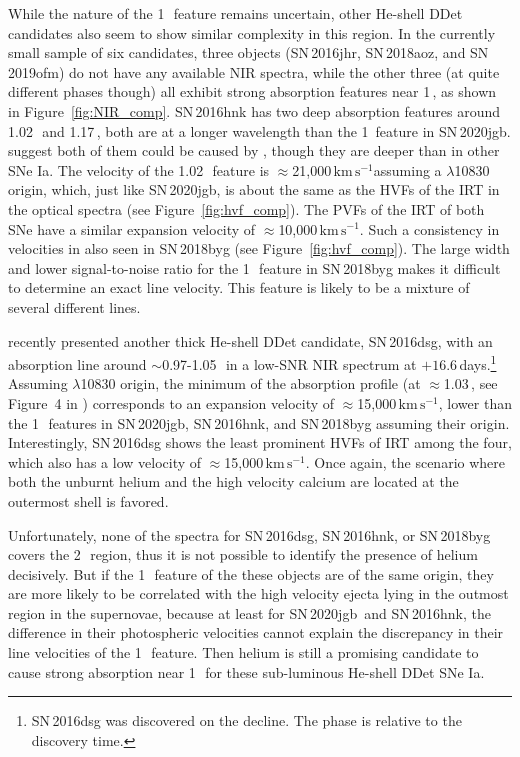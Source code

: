 \documentclass[twocolumn]{aastex631}
\newcommand{\sn}{SN\,2020jgb}
\newcommand{\kms}{$\mathrm{km}\,\mathrm{s}^{-1}$}
\begin{document}
{While the nature of the 1\,\micron\ feature remains uncertain, other He-shell DDet candidates also seem to show similar complexity in this region. In the currently small sample of six candidates, three objects (SN\,2016jhr, SN\,2018aoz, and SN\,2019ofm) do not have any available NIR spectra, while the other three (at quite different phases though) all exhibit strong absorption features near 1\,\micron, as shown in Figure~\ref{fig:NIR_comp}. SN\,2016hnk has two deep absorption features around 1.02\,\micron\ and 1.17\,\micron, both are at a longer wavelength than the 1\micron\ feature in \sn. \citet{galbany_16hnk_2019} suggest both of them could be caused by , though they are deeper than in other SNe Ia. The velocity of the 1.02\,\micron\ feature is $\approx$21,000\,\kms assuming a  $\lambda$10830 origin, which, just like \sn, is about the same as the HVFs of the  IRT in the optical spectra (see Figure~\ref{fig:hvf_comp}). The PVFs of the  IRT of both SNe have a similar expansion velocity of $\approx$10,000\,\kms. Such a consistency in velocities in also seen in SN\,2018byg (see Figure~\ref{fig:hvf_comp}). The large width and lower signal-to-noise ratio for the 1\,\micron\ feature in SN\,2018byg makes it difficult to determine an exact line velocity. This feature is likely to be a mixture of several different lines. 

\citet{Dong_16dsg_2022} recently presented another thick He-shell DDet candidate, SN\,2016dsg, with an absorption line around $\sim$0.97-1.05\,\micron\ in a low-SNR NIR spectrum at $+16.6$\,days.\footnote{SN\,2016dsg was discovered on the decline. The phase is relative to the discovery time.} Assuming  $\lambda$10830 origin, the minimum of the absorption profile (at $\approx$1.03\,\micron, see Figure~4 in \citealp{Dong_16dsg_2022}) corresponds to an expansion velocity of $\approx$15,000\,\kms, lower than the 1\,\micron\ features in \sn, SN\,2016hnk, and SN\,2018byg assuming their  origin. Interestingly, SN\,2016dsg shows the least prominent HVFs of  IRT among the four, which also has a low velocity of $\approx$15,000\,\kms. Once again, the scenario where both the unburnt helium and the high velocity calcium are located at the outermost shell is favored.

Unfortunately, none of the spectra for SN\,2016dsg, SN\,2016hnk, or SN\,2018byg covers the 2\,\micron\ region, thus it is not possible to identify the presence of helium decisively. But if the 1\,\micron\ feature of the these objects are of the same origin, they are more likely to be correlated with the high velocity ejecta lying in the outmost region in the supernovae, because at least for \sn\ and SN\,2016hnk, the difference in their photospheric velocities cannot explain the discrepancy in their line velocities of the 1\,\micron\ feature. Then helium is still a promising candidate to cause strong absorption near 1\,\micron\ for these sub-luminous He-shell DDet SNe Ia. 

}
\end{document}
